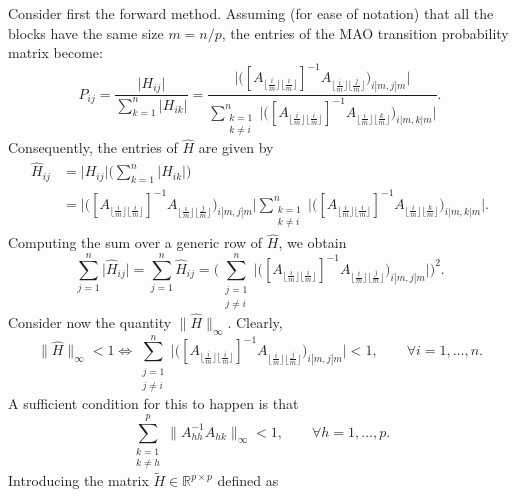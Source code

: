 \documentclass[times]{nlaauth}
\begin{document}
Consider first the forward method. Assuming (for ease of notation)
that all the blocks have the same size $m=n/p$,
the entries of the MAO transition probability matrix become:
\[
 P_{ij}=\frac{\lvert H_{ij} \rvert}{\sum_{k=1}^n\lvert H_{ik}
\rvert}=\frac{\bigg \lvert \bigg ([A_{\lfloor
\frac{i}{m}\rfloor \lfloor
\frac{i}{m}\rfloor}]^{-1} A_{\lfloor \frac{i}{m}\rfloor \lfloor
\frac{j}{m}\rfloor}\bigg )_{i|m,j|m}\bigg
\rvert}{\displaystyle \sum_{\substack{k=1\\k\ne i}}^n\bigg \lvert \bigg
([A_{\lfloor
\frac{i}{m}\rfloor \lfloor
\frac{i}{m}\rfloor}]^{-1} A_{\lfloor \frac{i}{m}\rfloor \lfloor
\frac{k}{m}\rfloor}\bigg )_{i|m,k|m}\bigg \rvert}.
\]
Consequently, the entries of $\hat{H}$ are given by
\[
\begin{array}{rl}
\hat{H}_{ij} & = \lvert H_{ij}\rvert\bigg(\sum_{k=1}^n\lvert H_{ik}\rvert\bigg)\\
& =
\bigg \lvert \bigg ([A_{\lfloor \frac{i}{m}\rfloor \lfloor
\frac{i}{m}\rfloor}]^{-1} A_{\lfloor \frac{i}{m}\rfloor \lfloor
\frac{j}{m}\rfloor}\bigg )_{i|m,j|m}\bigg
\rvert
{\displaystyle
\sum_{\substack{k=1\\k\ne i}}^n\bigg \lvert \bigg ([A_{\lfloor
\frac{i}{m}\rfloor \lfloor
\frac{i}{m}\rfloor}]^{-1} A_{\lfloor \frac{i}{m}\rfloor \lfloor
\frac{k}{m}\rfloor}\bigg )_{i|m,k|m}\bigg \rvert.
}
\end{array}
\]
Computing the sum over a generic row of $\hat{H}$, we obtain
\[
 \sum_{j=1}^n \lvert \hat{H}_{ij}\rvert=\sum_{j=1}^n \hat{H}_{ij} =
 \bigg ( \sum_{\substack{j=1\\j\ne i}}^n\bigg \lvert \bigg ([A_{\lfloor
\frac{i}{m}\rfloor \lfloor
\frac{i}{m}\rfloor}]^{-1} A_{\lfloor \frac{i}{m}\rfloor \lfloor
\frac{j}{m}\rfloor}\bigg )_{i|m,j|m}\bigg \rvert \bigg ) ^2.
\]
Consider now the quantity $\lVert \hat{H}\rVert_{\infty}$. Clearly,
\[
 \lVert \hat{H}\rVert_{\infty}<1 \Leftrightarrow \sum_{\substack{j=1\\j\ne
i}}^n\bigg \lvert \bigg ([A_{\lfloor
\frac{i}{m}\rfloor \lfloor
\frac{i}{m}\rfloor}]^{-1} A_{\lfloor \frac{i}{m}\rfloor \lfloor
\frac{j}{m}\rfloor}\bigg )_{i|m,j|m}\bigg \rvert <1, \qquad \forall
i=1,\ldots,n.
\]
 A sufficient condition for this to happen is that
 \begin{equation}
  \sum_{\substack{k=1\\k\ne h}}^p \lVert A_{hh}^{-1}A_{hk}\rVert_{\infty}<1,
    \label{block_cs}\qquad \forall h=1,\ldots,p.
 \end{equation}
Introducing the matrix $\tilde{H}\in \mathbb{R}^{p\times p}$ defined as
\end{document}
